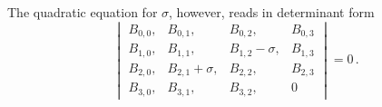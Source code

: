 \indent The quadratic equation for $\sigma$, however, reads in determinant form
\[
\begin{vmatrix}
B_{0,0}, & B_{0,1}, & B_{0,2}, & B_{0,3} \\
B_{1,0}, & B_{1,1}, & B_{1,2} - \sigma, & B_{1,3} \\
B_{2,0}, & B_{2,1} + \sigma, & B_{2,2}, & B_{2,3} \\
B_{3,0}, & B_{3,1}, & B_{3,2}, & 0
\end{vmatrix} = 0\,.
\]
